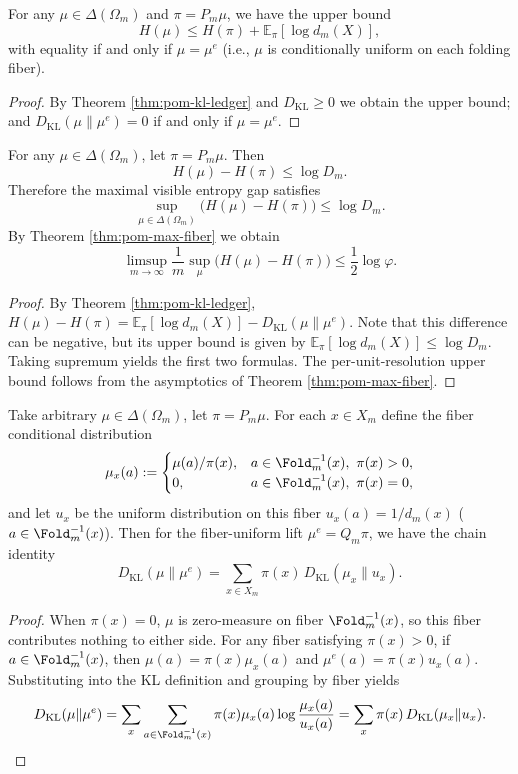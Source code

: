 \begin{corollary}\label{cor:pom-kl-ledger-bound}
For any $\mu\in\Delta(\Omega_m)$ and $\pi=P_m\mu$, we have the upper bound
\[
H(\mu)\le H(\pi)+\mathbb{E}_{\pi}[\log d_m(X)],
\]
with equality if and only if $\mu=\mu^{e}$ (i.e., $\mu$ is conditionally uniform on each folding fiber).
\end{corollary}
\begin{proof}
By Theorem \ref{thm:pom-kl-ledger} and $D_{\mathrm{KL}}\ge 0$ we obtain the upper bound; and $D_{\mathrm{KL}}(\mu\|\mu^e)=0$ if and only if $\mu=\mu^e$.
\end{proof}

\begin{corollary}\label{cor:pom-entropy-gap-bound}
For any $\mu\in\Delta(\Omega_m)$, let $\pi=P_m\mu$. Then
\[
H(\mu)-H(\pi)\le \log D_m.
\]
Therefore the maximal visible entropy gap satisfies
\[
\sup_{\mu\in\Delta(\Omega_m)}\bigl(H(\mu)-H(\pi)\bigr)\le \log D_m.
\]
By Theorem \ref{thm:pom-max-fiber} we obtain
\[
\limsup_{m\to\infty}\frac{1}{m}\sup_{\mu}\bigl(H(\mu)-H(\pi)\bigr)\le \frac12\log\varphi.
\]
\end{corollary}
\begin{proof}
By Theorem \ref{thm:pom-kl-ledger},
\(
H(\mu)-H(\pi)=\mathbb{E}_{\pi}[\log d_m(X)]-D_{\mathrm{KL}}(\mu\|\mu^e)
\).
Note that this difference can be negative, but its upper bound is given by $\mathbb{E}_{\pi}[\log d_m(X)]\le \log D_m$. Taking supremum yields the first two formulas. The per-unit-resolution upper bound follows from the asymptotics of Theorem \ref{thm:pom-max-fiber}.
\end{proof}

\begin{lemma}\label{lem:pom-fiberwise-kl}
Take arbitrary $\mu\in\Delta(\Omega_m)$, let $\pi=P_m\mu$. For each $x\in X_m$ define the fiber conditional distribution
\[
\mu_x(a):=
\begin{cases}
\mu(a)/\pi(x),& a\in \Fold_m^{-1}(x),\ \pi(x)>0,\\
0,& a\in \Fold_m^{-1}(x),\ \pi(x)=0,
\end{cases}
\]
and let $u_x$ be the uniform distribution on this fiber $u_x(a)=1/d_m(x)$ ($a\in\Fold_m^{-1}(x)$).
Then for the fiber-uniform lift $\mu^e=Q_m\pi$, we have the chain identity
\[
\boxed{\;
D_{\mathrm{KL}}(\mu\|\mu^e)=\sum_{x\in X_m}\pi(x)\,D_{\mathrm{KL}}(\mu_x\|u_x).
\;}
\]
\end{lemma}
\begin{proof}
When $\pi(x)=0$, $\mu$ is zero-measure on fiber $\Fold_m^{-1}(x)$, so this fiber contributes nothing to either side.
For any fiber satisfying $\pi(x)>0$, if $a\in\Fold_m^{-1}(x)$, then
\(
\mu(a)=\pi(x)\mu_x(a)
\)
and
\(
\mu^e(a)=\pi(x)u_x(a)
\).
Substituting into the KL definition and grouping by fiber yields
\[
D_{\mathrm{KL}}(\mu\|\mu^e)
=\sum_{x}\sum_{a\in\Fold_m^{-1}(x)}\pi(x)\mu_x(a)\log\frac{\mu_x(a)}{u_x(a)}
=\sum_x \pi(x)\,D_{\mathrm{KL}}(\mu_x\|u_x).
\]
\end{proof}

